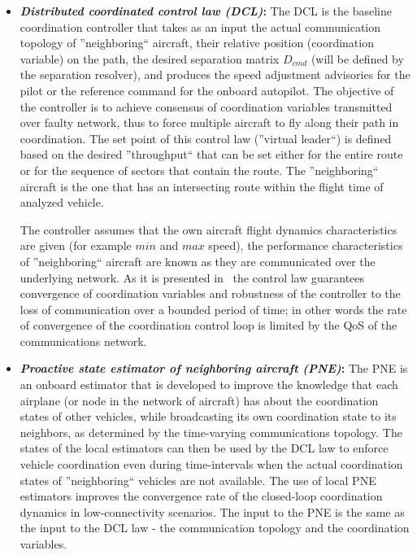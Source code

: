 \documentclass[letter,onecolumn,12pt]{aiaa-tc}
\newcommand{\1}{1_n}
\begin{document}
\begin{itemize}
\setlength{\itemsep}{-1pt}
\vspace{-2mm}

\item \textbf{\emph{Distributed coordinated control law (DCL)}:} The DCL is the baseline coordination controller that takes as an input the actual communication topology of ''neighboring`` aircraft, their relative position (coordination variable) on the path, the desired separation matrix $D_{cmd}$ (will be defined by the separation resolver),  and produces the speed adjustment advisories for the pilot or the reference command for the onboard autopilot. The objective of the controller is to achieve consensus of coordination variables transmitted over faulty network, thus to force multiple aircraft to fly along their path in coordination. The set point of this control law (''virtual leader``) is defined based on the desired ''throughput`` that can be set either for the entire route or for the sequence of sectors that contain the route.  The ''neighboring`` aircraft is the one that has an intersecting route within the flight time of analyzed vehicle.

The controller assumes that the own aircraft flight dynamics characteristics are given (for example $min$ and $max$ speed), the performance characteristics of ''neighboring`` aircraft are known as they are communicated over the underlying network. As it is presented in~\cite{CSM12_CPF} the control law guarantees convergence of coordination variables and robustness of the controller to the loss of communication over a bounded period of time; in other words the rate of convergence of the coordination control loop is limited by the QoS of the communications network.

\item \textbf{\emph{Proactive state estimator of neighboring aircraft (PNE)}:} The PNE is an onboard estimator that is developed to improve the knowledge that each airplane (or node in the network of aircraft) has about the coordination states of other vehicles, while  broadcasting its own coordination state to its neighbors, as determined by the time-varying communications topology. The states of the local estimators can then be used by the DCL law to enforce vehicle coordination even during time-intervals when the actual coordination states of ''neighboring`` vehicles are not available. The use of local PNE estimators improves the convergence rate of the closed-loop coordination dynamics in low-connectivity scenarios. The input to the PNE is the same as the input to the DCL law - the communication topology and the coordination variables.


\end{itemize}
\end{document}
